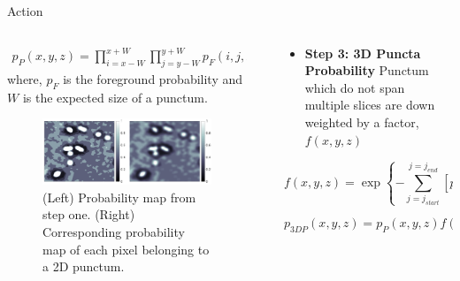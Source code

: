 \documentclass[final, table]{beamer}
\newlength{\sepwid}
\newlength{\onecolwid}
\newlength{\twocolwid}
\begin{document}
\begin{frame}[t]
\begin{columns}[t]
\begin{column}{\twocolwid}
\begin{block}{Action}
\begin{columns}[t]
\begin{column}{\onecolwid}
\begin{align} 
p_P(x, y, z) = \prod_{i=x-W}^{x+W} \prod_{j=y-W}^{y+W} p_F(i,j, z),
\end{align} 
where, $p_F$ is the foreground probability and $W$ is the expected size of a punctum. 
\begin{figure}[!h]
\includegraphics[width=1\textwidth]{figs/prob_conv}
\caption{(Left) Probability map from step one. (Right) Corresponding probability map of each pixel belonging to a 2D punctum.  }
\label{fig:prob_conv}
\end{figure}


\end{column}


\begin{column}{\sepwid}\end{column}  %
\begin{column}{\onecolwid}
\begin{itemize} 
\item \textbf{Step 3: 3D Puncta Probability} Punctum which do not span multiple slices are down weighted by a factor, $f(x, y, z)$ 
\end{itemize} 

\begin{equation} 
f(x, y, z) = \exp \left \{- \sum_{j=j_{start}}^{j=j_{end}} [p_P(x, y, z) - p_P(x, y, z+j)]^2 \right \}
\label{eq:factor}
\end{equation} 

\begin{equation}
p_{3DP}(x,y,z)= p_P(x,y,z) f(x,y,z),
\label{eq:p3dp} 
\end{equation}


\end{column}
\end{columns}
\end{block}
\end{column}
\end{columns}
\end{frame}
\end{document}
